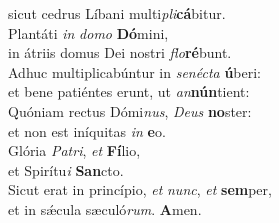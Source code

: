 \evenverse sicut cedrus Líbani multi\textit{pli}\textbf{cá}bitur.\\
\oddverse Plantáti \textit{in} \textit{do}\textit{mo} \textbf{Dó}mini,~\*\\
\oddverse in átriis domus Dei nostri \textit{flo}\textbf{ré}bunt.\\
\evenverse Adhuc multiplicabúntur in \textit{se}\textit{né}\textit{cta} \textbf{ú}beri:~\*\\
\evenverse et bene patiéntes erunt, ut \textit{an}\textbf{nún}tient:\\
\oddverse Quóniam rectus Dómi\textit{nus}, \textit{De}\textit{us} \textbf{no}ster:~\*\\
\oddverse et non est iníquitas \textit{in} \textbf{e}o.\\
\evenverse Glória \textit{Pa}\textit{tri}, \textit{et} \textbf{Fí}lio,~\*\\
\evenverse et Spirítu\textit{i} \textbf{San}cto.\\
\oddverse Sicut erat in princípio, \textit{et} \textit{nunc}, \textit{et} \textbf{sem}per,~\*\\
\oddverse et in sǽcula sæculó\textit{rum}. \textbf{A}men.\\
